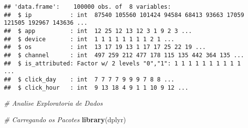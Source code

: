 \documentclass[]{article}
\newenvironment{Shaded}{\begin{snugshade}}{\end{snugshade}}
\newcommand{\CommentTok}[1]{\textcolor[rgb]{0.56,0.35,0.01}{\textit{#1}}}
\newcommand{\KeywordTok}[1]{\textcolor[rgb]{0.13,0.29,0.53}{\textbf{#1}}}
\newcommand{\NormalTok}[1]{#1}
\newcommand{\OperatorTok}[1]{\textcolor[rgb]{0.81,0.36,0.00}{\textbf{#1}}}
\newcommand{\OtherTok}[1]{\textcolor[rgb]{0.56,0.35,0.01}{#1}}
\newcommand{\StringTok}[1]{\textcolor[rgb]{0.31,0.60,0.02}{#1}}
\begin{document}
\begin{Shaded}
\end{Shaded}

\begin{verbatim}
## 'data.frame':    100000 obs. of  8 variables:
##  $ ip           : int  87540 105560 101424 94584 68413 93663 17059 121505 192967 143636 ...
##  $ app          : int  12 25 12 13 12 3 1 9 2 3 ...
##  $ device       : int  1 1 1 1 1 1 1 1 2 1 ...
##  $ os           : int  13 17 19 13 1 17 17 25 22 19 ...
##  $ channel      : int  497 259 212 477 178 115 135 442 364 135 ...
##  $ is_attributed: Factor w/ 2 levels "0","1": 1 1 1 1 1 1 1 1 1 1 ...
##  $ click_day    : int  7 7 7 7 9 9 9 7 8 8 ...
##  $ click_hour   : int  9 13 18 4 9 1 1 10 9 12 ...
\end{verbatim}

\begin{Shaded}
\begin{Highlighting}[]
\CommentTok{# Analise Exploratoria de Dados}

\CommentTok{# Carregando os Pacotes}
\KeywordTok{library}\NormalTok{(dplyr)}
\end{Highlighting}
\end{Shaded}
\end{document}
